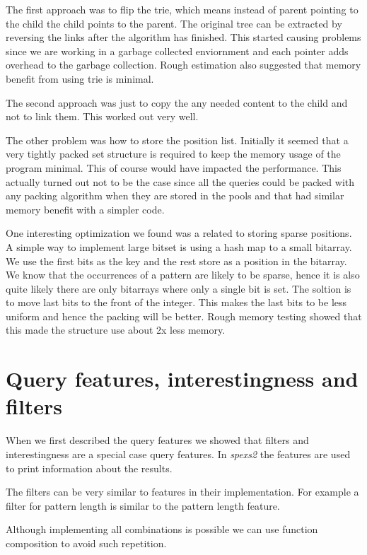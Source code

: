 The first approach was to flip the trie, which means instead of parent pointing to the child the child points to the parent. The original tree can be extracted by reversing the links after the algorithm has finished. This started causing problems since we are working in a garbage collected enviornment and each pointer adds overhead to the garbage collection. Rough estimation also suggested that memory benefit from using trie is minimal.

The second approach was just to copy the any needed content to the child and not to link them. This worked out very well.

The other problem was how to store the position list. Initially it seemed that a very tightly packed set structure is required to keep the memory usage of the program minimal. This of course would have impacted the performance. This actually turned out not to be the case since all the queries could be packed with any packing algorithm when they are stored in the pools and that had similar memory benefit with a simpler code.

One interesting optimization we found was a related to storing sparse positions. A simple way to implement large bitset is using a hash map to a small bitarray. We use the first bits as the key and the rest store as a position in the bitarray. We know that the occurrences of a pattern are likely to be sparse, hence it is also quite likely there are only bitarrays where only a single bit is set. The soltion is to move last bits to the front of the integer. This makes the last bits to be less uniform and hence the packing will be better. Rough memory testing showed that this made the structure use about 2x less memory.

\section{Query features, interestingness and filters}

When we first described the query features we showed that filters and interestingness are a special case query features. In \emph{spexs2} the features are used to print information about the results.

The filters can be very similar to features in their implementation. For example a filter for pattern length is similar to the pattern length feature.

Although implementing all combinations is possible we can use function composition to avoid such repetition.

